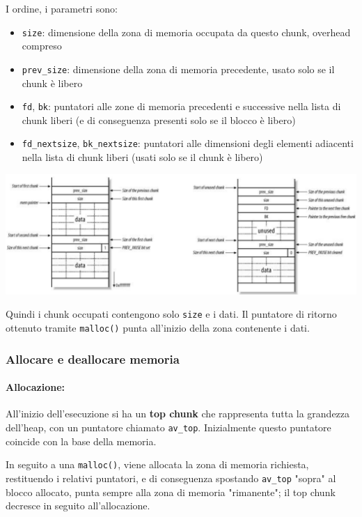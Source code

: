 I ordine, i parametri sono:
\begin{itemize}
    \item \texttt{size}: dimensione della zona di memoria occupata da questo chunk, overhead compreso
    
	\item \texttt{prev\_size}: dimensione della zona di memoria precedente, usato solo se il chunk è libero

	\item \texttt{fd}, \texttt{bk}: puntatori alle zone di memoria precedenti e successive nella lista di chunk liberi (e di conseguenza presenti solo se il blocco è libero)

	\item \texttt{fd\_nextsize}, \texttt{bk\_nextsize}: puntatori alle dimensioni degli elementi adiacenti nella lista di chunk liberi (usati solo se il chunk è libero)
\end{itemize}
\begin{center}
	\includegraphics[width=\linewidth]{img/sme/heapchunk}
\end{center}

Quindi i chunk occupati contengono solo \texttt{size} e i dati. Il puntatore di ritorno ottenuto tramite \texttt{malloc()} punta all'inizio della zona contenente i dati.

\subsubsection{Allocare e deallocare memoria}

\paragraph{Allocazione:} All'inizio dell'esecuzione si ha un \textbf{top chunk} che rappresenta tutta la grandezza dell'heap, con un puntatore chiamato \texttt{av\_top}. Inizialmente questo puntatore coincide con la base della memoria. 

In seguito a una \texttt{malloc()}, viene allocata la zona di memoria richiesta, restituendo i relativi puntatori, e di conseguenza spostando \texttt{av\_top} "sopra" al blocco allocato, punta sempre alla zona di memoria "rimanente"; il top chunk decresce in seguito all'allocazione.

